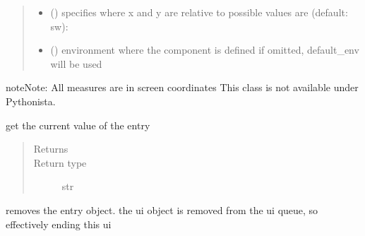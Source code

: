 \documentclass[letterpaper,10pt,english]{sphinxmanual}
\begin{document}
\begin{fulllineitems}
\begin{quote}
\begin{description}
\begin{itemize}
\item {} 
 () \textendash{} specifies where x and y are relative to 
possible values are (default: sw): 

\item {} 
 ({\hyperref[\detokenize{Reference:salabim.Environment}]{}}) \textendash{} environment where the component is defined 
if omitted, default\_env will be used

\end{itemize}

\end{description}\end{quote}

\begin{sphinxadmonition}{note}{Note:}
All measures are in screen coordinates 
This class is not available under Pythonista.
\end{sphinxadmonition}

\begin{fulllineitems}
\label{\detokenize{Reference:salabim.AnimateEntry.get}}
get the current value of the entry
\begin{quote}\begin{description}
\item[{Returns}] \leavevmode
{}

\item[{Return type}] \leavevmode
str

\end{description}\end{quote}

\end{fulllineitems}


\begin{fulllineitems}
\label{\detokenize{Reference:salabim.AnimateEntry.remove}}
removes the entry object. 
the ui object is removed from the ui queue,
so effectively ending this ui

\end{fulllineitems}


\end{fulllineitems}
\end{document}

